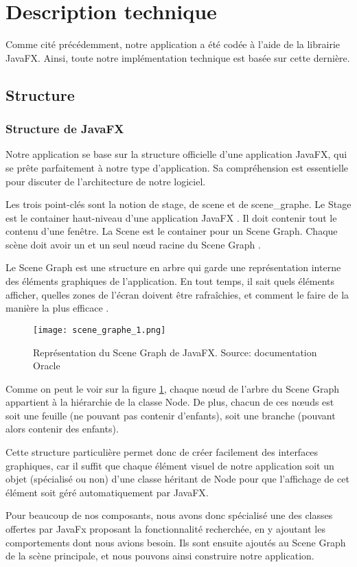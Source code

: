 \section{Description technique}

Comme cité précédemment, notre application a été codée à l'aide de la librairie JavaFX. Ainsi, toute notre implémentation technique est basée sur cette dernière.

\subsection{Structure}
\subsubsection{Structure de JavaFX}
Notre application se base sur la structure officielle d'une application JavaFX, qui se prête parfaitement à notre type d'application. Sa compréhension est essentielle pour discuter de l'architecture de notre logiciel.
\par
Les trois point-clés sont la notion de \gls{stage}, de \gls{scene} et de \gls{scene_graphe}. Le Stage est le container haut-niveau d'une application JavaFX \cite{javadoc_stage}. Il doit contenir tout le contenu d'une fenêtre. La Scene est le container pour un Scene Graph. Chaque scène doit avoir un et un seul n\oe ud racine du Scene Graph \cite{javadoc_scene}.
\par
Le Scene Graph est une structure en arbre qui garde une représentation interne des éléments graphiques de l'application. En tout temps, il sait quels éléments afficher, quelles zones de l'écran doivent être rafraîchies, et comment le faire de la manière la plus efficace \cite{javadoc_scene_graphe}. 	

\begin{figure}[H]
	\caption{Représentation du Scene Graph de JavaFX. Source: documentation Oracle \cite{javadoc_scene_graphe}}
	\centering
	\texttt{[image: scene\_graphe\_1.png]}
	\label{fig:scene_graphe_1}
\end{figure}
Comme on peut le voir sur la figure \ref{fig:scene_graphe_1}, chaque n\oe ud de l'arbre du Scene Graph appartient à la hiérarchie de la classe Node. De plus, chacun de ces n\oe uds est soit une feuille (ne pouvant pas contenir d'enfants), soit une branche (pouvant alors contenir des enfants).
\par
Cette structure particulière permet donc de créer facilement des interfaces graphiques, car il suffit que chaque élément visuel de notre application soit un objet (spécialisé ou non) d'une classe héritant de Node pour que l'affichage de cet élément soit géré automatiquement par JavaFX.
\par
Pour beaucoup de nos composants, nous avons donc spécialisé une des classes offertes par JavaFx proposant la fonctionnalité recherchée, en y ajoutant les comportements dont nous avions besoin. Ils sont ensuite ajoutés au Scene Graph de la scène principale, et nous pouvons ainsi construire notre application.


